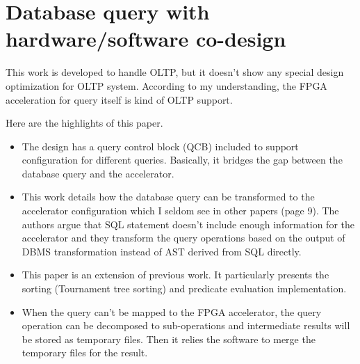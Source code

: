 \section{Database query with hardware/software co-design}
This work is developed to handle OLTP, but it doesn't show any special design optimization for OLTP system.
According to my understanding, the FPGA acceleration for query itself is kind of OLTP support.

Here are the highlights of this paper.
\begin{itemize}
    \item The design has a query control block (QCB) included to support configuration for different queries. Basically, it bridges the gap between the database query and the accelerator.  
    \item This work details how the database query can be transformed to the accelerator configuration which I seldom see in other papers (page 9). The authors argue that SQL statement doesn't include enough information for the accelerator and they transform the query operations based on the output of DBMS transformation instead of AST derived from SQL directly.  
    \item This paper is an extension of previous work. It particularly presents the sorting (Tournament tree sorting) and predicate evaluation implementation.
    \item When the query can't be mapped to the FPGA accelerator, the query operation can be decomposed to sub-operations and intermediate results will be stored as temporary files. Then it relies the software to merge the temporary files for the result. 
\end{itemize}
